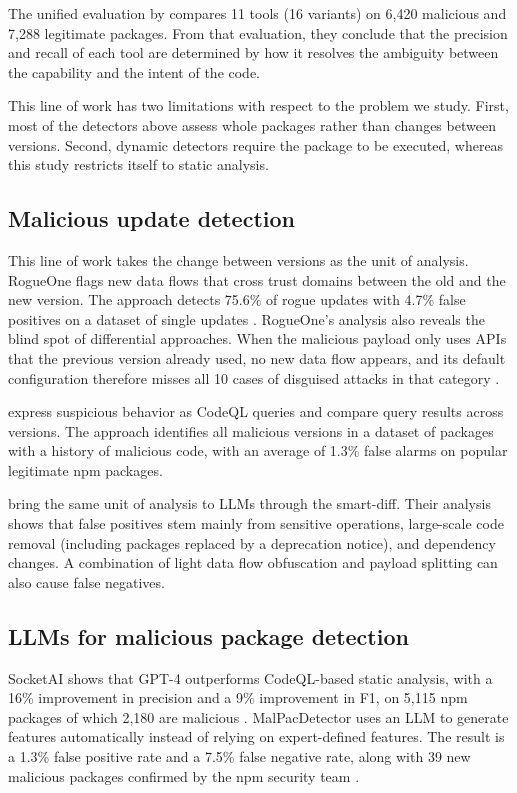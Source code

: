 \documentclass[a4paper,fleqn]{cas-dc}
\begin{document}
The unified evaluation by \citet{guo2026effective} compares 11 tools (16
variants) on 6,420 malicious and 7,288 legitimate packages. From that evaluation,
they conclude that the precision and recall of each tool are determined by how it
resolves the ambiguity between the capability and the intent of the code.

This line of work has two limitations with respect to the problem we study.
First, most of the detectors above assess whole packages rather than changes
between versions. Second, dynamic detectors require the package to be executed,
whereas this study restricts itself to static analysis.

\subsection{Malicious update detection}

This line of work takes the change between versions as the unit of analysis.
RogueOne flags new data flows that cross trust domains between the old and the
new version. The approach detects 75.6\% of rogue updates with 4.7\% false
positives on a dataset of single updates \citep{sofaer2024rogueone}. RogueOne's
analysis also reveals the blind spot of differential approaches. When the
malicious payload only uses APIs that the previous version already used, no new
data flow appears, and its default configuration therefore misses all 10 cases of
disguised attacks in that category \citep{sofaer2024rogueone}.

\citet{froh2023differential} express suspicious behavior as CodeQL queries and
compare query results across versions. The approach identifies all malicious
versions in a dataset of packages with a history of malicious code, with an
average of 1.3\% false alarms on popular legitimate npm packages.

\citet{wyss2025evaluating} bring the same unit of analysis to LLMs through the
smart-diff. Their analysis shows that false positives stem mainly from sensitive
operations, large-scale code removal (including packages replaced by a deprecation
notice), and dependency changes. A combination of light data flow obfuscation and
payload splitting can also cause false negatives.

\subsection{LLMs for malicious package detection}

SocketAI shows that GPT-4 outperforms CodeQL-based static analysis, with a 16\%
improvement in precision and a 9\% improvement in F1, on 5,115 npm packages of
which 2,180 are malicious \citep{zahan2025leveraging}. MalPacDetector uses an LLM
to generate features automatically instead of relying on expert-defined features.
The result is a 1.3\% false positive rate and a 7.5\% false negative rate, along
with 39 new malicious packages confirmed by the npm security team
\citep{wang2025malpacdetector}.
\end{document}
